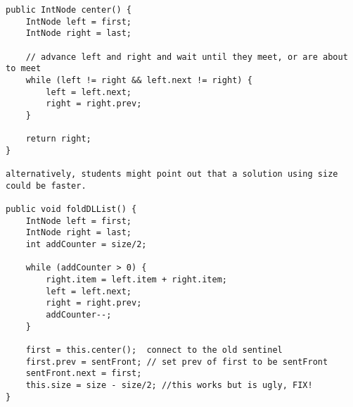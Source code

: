 \newpage
\begin{solution}
\begin{lstlisting}
public IntNode center() {
	IntNode left = first;
	IntNode right = last;
	
	// advance left and right and wait until they meet, or are about to meet
	while (left != right && left.next != right) {
		left = left.next;
		right = right.prev;
	}

	return right;
}

alternatively, students might point out that a solution using size could be faster.

public void foldDLList() {
	IntNode left = first;
	IntNode right = last;
	int addCounter = size/2;
    
	while (addCounter > 0) {
		right.item = left.item + right.item;
		left = left.next;
		right = right.prev;
		addCounter--;
	}
	
	first = this.center();  connect to the old sentinel
	first.prev = sentFront; // set prev of first to be sentFront
	sentFront.next = first;
	this.size = size - size/2; //this works but is ugly, FIX!
}
\end{lstlisting}
\end{solution}
